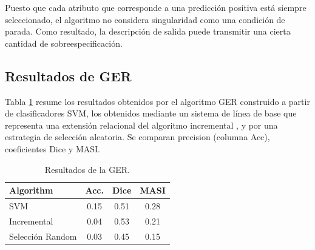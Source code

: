 Puesto que cada atributo que corresponde a una predicci\'on positiva est\'a siempre seleccionado, el algoritmo no considera singularidad como una condici\'on de parada. Como resultado, la descripci\'on de salida puede transmitir una cierta cantidad de sobreespecificaci\'on.


\subsection{Resultados de GER }

Tabla \ref{tab-reg-results} resume los resultados obtenidos por el algoritmo GER construido a partir de clasificadores SVM, los obtenidos mediante un sistema de l\'{i}nea de base que representa una extensi\'on relacional del algoritmo incremental \cite{incremental}, y por una estrategia de selecci\'on aleatoria. Se comparan precision (columna Acc), coeficientes Dice y MASI.

\begin{table}[H]
\begin{center}
\begin{tabular} {  l c c c }
\hline
{Algorithm}							& {Acc.} 	& { Dice}		& MASI \\ \hline 
SVM											& 0.15		& 0.51			& 0.28 \\
Incremental							& 0.04		& 0.53			& 0.21 \\
Selecci\'on Random        	& 0.03    & 0.45      & 0.15 \\
\hline
\end{tabular}
\end{center}
\caption{Resultados de la GER.}
\label{tab-reg-results}

\end{table}



